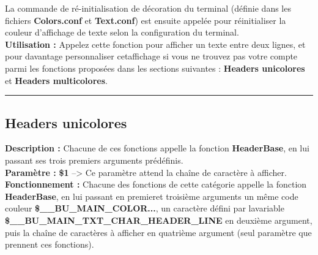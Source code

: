 \documentclass[a4paper,10pt]{article}
\begin{document}
La commande de ré-initialisation de décoration du terminal (définie dans les fichiers \textbf{\color{lime}Colors.conf\color{white}} et \textbf{\color{lime}Text.conf\color{white}}) est ensuite appelée pour réinitialiser la couleur d'affichage de texte selon la configuration du terminal.\\[1\baselineskip]

\textbf{Utilisation :}\linebreak
Appelez cette fonction pour afficher un texte entre deux lignes, et pour davantage personnaliser cet\linebreak affichage si vous ne trouvez pas votre compte parmi les fonctions proposées dans les sections suivantes :
\textbf{\color{green}Headers unicolores\color{white}} et \textbf{\color{green}Headers multicolores\color{white}}.\\[1\baselineskip]


\color{green}\par\noindent\rule{\textwidth}{0.4pt}\color{white}

\color{green}
\subsection{Headers unicolores}\color{white}
\textbf{Description :}\linebreak
Chacune de ces fonctions appelle la fonction \textbf{\color{mauve}HeaderBase\color{white}}, en lui passant ses trois premiers\linebreak
arguments prédéfinis.\\[1\baselineskip]

\textbf{Paramètre :}\linebreak
\textbf{\color{orange}\$1\color{white}} --> Ce paramètre attend la chaîne de caractère à afficher.\\[1\baselineskip]


\textbf{Fonctionnement :}\linebreak
Chacune des fonctions de cette catégorie appelle la fonction \textbf{\color{mauve}HeaderBase\color{white}}, en lui passant en premier\linebreak et troisième arguments un même code couleur \textbf{\color{orange}\$\_\_BU\_MAIN\_COLOR...\color{white}}, un caractère défini par la\linebreak variable \textbf{\color{orange}\$\_\_BU\_MAIN\_TXT\_CHAR\_HEADER\_LINE\color{white}} en deuxième argument, puis la chaîne de caractères à afficher en quatrième argument (seul paramètre que prennent ces fonctions).\\[1\baselineskip]
\end{document}
